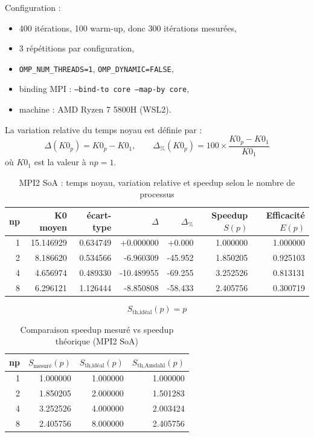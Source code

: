 Configuration :
\begin{itemize}[leftmargin=*]
  \item 400 itérations, 100 warm-up, donc 300 itérations mesurées,
  \item 3 répétitions par configuration,
  \item \texttt{OMP\_NUM\_THREADS=1}, \texttt{OMP\_DYNAMIC=FALSE},
  \item binding MPI : \texttt{--bind-to core --map-by core},
  \item machine : AMD Ryzen 7 5800H (WSL2).
\end{itemize}

La variation relative du temps noyau est définie par :
\[
\Delta(K0_p)=K0_p-K0_1,
\qquad
\Delta_{\%}(K0_p)=100\times\frac{K0_p-K0_1}{K0_1}
\]
où \(K0_1\) est la valeur à \(np=1\).

\begin{table}[H]
\centering
\scriptsize
\caption{MPI2 SoA : temps noyau, variation relative et speedup selon le nombre de processus}
\label{tab:mpi2-speedup}
\begin{tabular}{@{}rrrrrrr@{}}
\toprule
\textbf{np} & \textbf{K0 moyen} & \textbf{écart-type} & \textbf{\(\Delta\)} & \textbf{\(\Delta_{\%}\)} & \textbf{Speedup \(S(p)\)} & \textbf{Efficacité \(E(p)\)} \\
\midrule
1 & 15.146929 & 0.634749 & +0.000000 & +0.000 & 1.000000 & 1.000000 \\
2 & 8.186620 & 0.534566 & -6.960309 & -45.952 & 1.850205 & 0.925103 \\
4 & 4.656974 & 0.489330 & -10.489955 & -69.255 & 3.252526 & 0.813131 \\
8 & 6.296121 & 1.126444 & -8.850808 & -58.433 & 2.405756 & 0.300719 \\
\bottomrule
\end{tabular}
\end{table}

\[
S_{\text{th,idéal}}(p)=p
\]

\begin{table}[H]
\centering
\caption{Comparaison speedup mesuré vs speedup théorique (MPI2 SoA)}
\label{tab:mpi2-speedup-theory}
\begin{tabular}{@{}rrrr@{}}
\toprule
\textbf{np} & \textbf{\(S_{\text{mesuré}}(p)\)} & \textbf{\(S_{\text{th,idéal}}(p)\)} & \textbf{\(S_{\text{th,Amdahl}}(p)\)} \\
\midrule
1 & 1.000000 & 1.000000 & 1.000000 \\
2 & 1.850205 & 2.000000 & 1.501283 \\
4 & 3.252526 & 4.000000 & 2.003424 \\
8 & 2.405756 & 8.000000 & 2.405756 \\
\bottomrule
\end{tabular}
\end{table}

